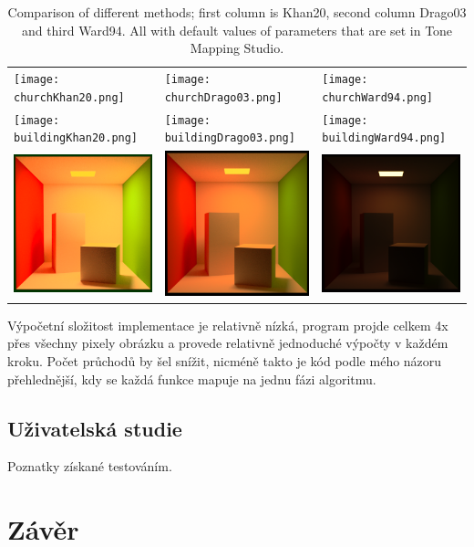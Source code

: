 \documentclass[11pt,a4paper,oneside]{article}
\begin{document}
\begin{table}[h]
    \centering
    \caption{Comparison of different methods; first column is Khan20, second
    column Drago03 and third Ward94. All with default values of parameters that
    are set in Tone Mapping Studio.}
    \label{tab:method-comp}
    \begin{tabular}{lll}
        \texttt{[image: churchKhan20.png]} &
        \texttt{[image: churchDrago03.png]} &
        \texttt{[image: churchWard94.png]} \\
    \texttt{[image: buildingKhan20.png]} &
        \texttt{[image: buildingDrago03.png]} &
        \texttt{[image: buildingWard94.png]}\\
    \includegraphics[width=.3\linewidth,valign=m]{cornell_boxKhan20.png} &
        \includegraphics[width=.3\linewidth,valign=m]{cornell_boxDrago03.png} &
        \includegraphics[width=.3\linewidth,valign=m]{cornell_boxWard94.png}\\
    \end{tabular}
\end{table}


Výpočetní složitost implementace je relativně nízká, program projde celkem 4x
přes všechny pixely obrázku a provede relativně jednoduché výpočty v každém
kroku. Počet průchodů by šel snížit, nicméně takto je kód podle mého názoru
přehlednější, kdy se každá funkce mapuje na jednu fázi algoritmu.

\subsection{Uživatelská studie}

Poznatky získané testováním.


\section{Závěr}



\end{document}
